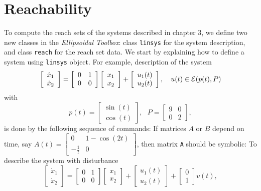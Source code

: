 \documentclass{report}
\newcommand{\EE}{{\cal E}}
\begin{document}
\section{Reachability}
To compute the reach sets of the systems described in chapter 3, we define
two new classes in the {\it Ellipsoidal Toolbox}: class {\tt linsys} for the
system description, and class {\tt reach} for the reach set data.
We start by explaining how to define a system using {\tt linsys} object.
For example, description of the system
\[ \left[\begin{array}{cc}
\dot{x}_1\\
\dot{x}_2\end{array}\right] = \left[\begin{array}{cc}
0 & 1\\
0 & 0\end{array}\right]\left[\begin{array}{c}
x_1\\
x_2\end{array}\right] + \left[\begin{array}{c}
u_1(t)\\
u_2(t)\end{array}\right], ~~~ u(t)\in\EE(p(t), P) \]
with
\[ p(t) = \left[\begin{array}{c}
\sin(t)\\
\cos(t)\end{array}\right], ~~~ P = \left[\begin{array}{cc}
9 & 0\\
0 & 2\end{array}\right], \]
is done by the following sequence of commands:
If matrices $A$ or $B$ depend on time, say $A(t)=\left[\begin{array}{cc}
0 & 1-\cos(2t)\\
-\frac{1}{t} & 0\end{array}\right]$, then matrix {\tt A} should be symbolic:
To describe the system with disturbance
\[ \left[\begin{array}{cc}
\dot{x}_1\\
\dot{x}_2\end{array}\right] = \left[\begin{array}{cc}
0 & 1\\
0 & 0\end{array}\right]\left[\begin{array}{c}
x_1\\
x_2\end{array}\right] + \left[\begin{array}{c}
u_1(t)\\
u_2(t)\end{array}\right] + \left[\begin{array}{c}
0\\
1\end{array}\right]v(t), \]
\end{document}
